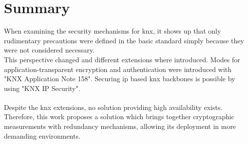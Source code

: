 \section{Summary}
When examining the security mechanisms for \gls{knx}, it shows up that only rudimentary precautions were defined in the basic standard simply because they were not considered
necessary. 
\\
This perspective changed and different extensions where introduced. 
Modes for application-transparent encryption and authentication were introduced with "KNX Application Note 158". Securing \gls{ip} based \gls{knx} backbones is possible by using 
"KNX IP Security".
\\
\\
Despite the \gls{knx} extensions, no solution providing high availability exists. Therefore, this work proposes a solution which brings together cryptographic measurements with
redundancy mechanisms, allowing its deployment in more demanding environments.


